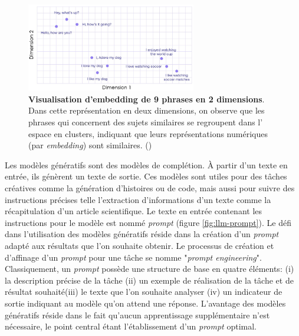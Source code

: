 \begin{figure}[!ht]
 \centering
 \includegraphics[width=0.66\textwidth]{figures/sentence_embed.png}
 \caption[Visualisation d'embedding de 9 phrases en 2 dimensions]{\textbf{Visualisation d'embedding de 9 phrases en 2 dimensions}. Dans cette représentation en deux dimensions, on observe que les phrases qui concernent des sujets similaires se regroupent dans l' espace en clusters, indiquant que leurs représentations numériques (par \textit{embedding}) sont similaires. (\cite{luis_serrano_what_2023})}
 \label{fig:sentence_embed}
\end{figure}


Les modèles génératifs sont des modèles de complétion. À partir d'un texte en entrée, ils génèrent un texte de sortie. Ces modèles sont utiles pour des tâches créatives comme la génération d'histoires ou de code, mais aussi pour suivre des instructions précises telle l'extraction d'informations d'un texte comme la récapitulation d'un article scientifique. Le texte en entrée contenant les instructions pour le modèle est nommé \textit{prompt} (figure \ref{fig:llm-prompt}). Le défi dans l'utilisation des modèles génératifs réside dans la création d'un \textit{prompt} adapté aux résultats que l'on souhaite obtenir. Le processus de création et d'affinage d'un \textit{prompt} pour une tâche se nomme "\textit{prompt engineering}". Classiquement, un \textit{prompt} possède une structure de base en quatre éléments: (i) la description précise de la tâche (ii) un exemple de réalisation de la tâche et de résultat souhaité(iii) le texte que l'on souhaite analyser (iv) un indicateur de sortie indiquant au modèle qu'on attend une réponse. L'avantage des modèles génératifs réside dans le fait qu'aucun apprentissage supplémentaire n'est nécessaire, le point central étant l'établissement d'un \textit{prompt} optimal.

